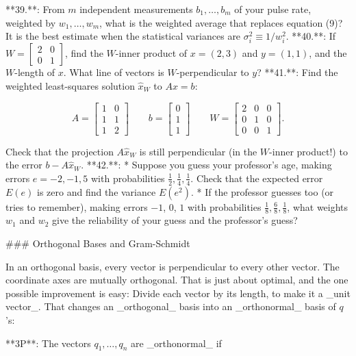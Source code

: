 

**39.**: From \(m\) independent measurements \(b_{1},\ldots,b_{m}\) of your pulse rate, weighted by \(w_{1},\ldots,w_{m}\), what is the weighted average that replaces equation (9)? It is the best estimate when the statistical variances are \(\sigma_{i}^{2}\equiv 1/w_{i}^{2}\).
**40.**: If \(W=\left[\begin{smallmatrix}2&0\\ 0&1\end{smallmatrix}\right]\), find the \(W\)-inner product of \(x=(2,3)\) and \(y=(1,1)\), and the \(W\)-length of \(x\). What line of vectors is \(W\)-perpendicular to \(y\)?
**41.**: Find the weighted least-squares solution \(\widehat{x}_{W}\) to \(Ax=b\):

\[A=\begin{bmatrix}1&0\\ 1&1\\ 1&2\end{bmatrix}\qquad b=\begin{bmatrix}0\\ 1\\ 1\end{bmatrix}\qquad W=\begin{bmatrix}2&0&0\\ 0&1&0\\ 0&0&1\end{bmatrix}.\]

Check that the projection \(A\widehat{x}_{W}\) is still perpendicular (in the \(W\)-inner product!) to the error \(b-A\widehat{x}_{W}\).
**42.**:
* Suppose you guess your professor's age, making errors \(e=-2,-1,5\) with probabilities \(\frac{1}{2},\frac{1}{4},\frac{1}{4}\). Check that the expected error \(E(e)\) is zero and find the variance \(E(e^{2})\).
* If the professor guesses too (or tries to remember), making errors \(-1\), \(0\), \(1\) with probabilities \(\frac{1}{8},\frac{6}{8},\frac{1}{8}\), what weights \(w_{1}\) and \(w_{2}\) give the reliability of your guess and the professor's guess?

### Orthogonal Bases and Gram-Schmidt

In an orthogonal basis, every vector is perpendicular to every other vector. The coordinate axes are mutually orthogonal. That is just about optimal, and the one possible improvement is easy: Divide each vector by its length, to make it a _unit vector_. That changes an _orthogonal_ basis into an _orthonormal_ basis of \(q\)'s:

**3P**: The vectors \(q_{1},\ldots,q_{n}\) are _orthonormal_ if

